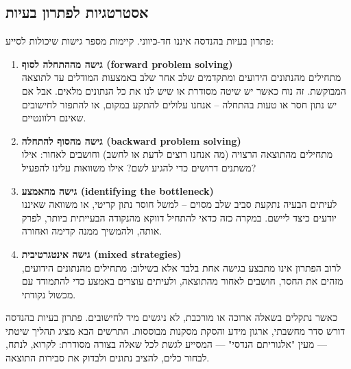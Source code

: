 \documentclass[
  hebrew,
  letterpaper,
  DIV=11,
  numbers=noendperiod]{scrreprt}
\begin{document}
\subsection{\texorpdfstring{{אסטרטגיות לפתרון
בעיות}}{אסטרטגיות לפתרון בעיות}}\label{ux5d0ux5e1ux5d8ux5e8ux5d8ux5d2ux5d9ux5d5ux5ea-ux5dcux5e4ux5eaux5e8ux5d5ux5df-ux5d1ux5e2ux5d9ux5d5ux5ea}

{פתרון בעיות בהנדסה איננו חד-כיווני. קיימות מספר גישות שיכולות לסייע}:

\begin{enumerate}
\def\labelenumi{\arabic{enumi}.}
\item
  \textbf{{גישה מההתחלה לסוף} (forward problem solving)}\\
  {מתחילים מהנתונים הידועים ומתקדמים שלב אחר שלב באמצעות המודלים עד
  לתוצאה המבוקשת}. {זה נוח כאשר יש שיטה מסודרת או שיש לנו את כל הנתונים
  מלאים. אבל} {אם יש נתון חסר או טעות בהתחלה -- אנחנו עלולים להתקע
  במקום, או להתפזר לחישובים שאינם רלוונטיים.}
\item
  \textbf{{גישה מהסוף להתחלה} {}(backward problem solving)}\\
  {מתחילים מהתוצאה הרצויה (מה אנחנו רוצים לדעת או לחשב) וחושבים לאחור:
  אילו משתנים דרושים כדי להגיע לשם? אילו משוואות עלינו להפעיל}? {}
\item
  \textbf{{גישה מהאמצע} (identifying the bottleneck)}\\
  {לעיתים הבעיה נתקעת סביב שלב מסוים -- למשל חוסר נתון קריטי, או משוואה
  שאיננו יודעים כיצד ליישם. במקרה כזה כדאי להתחיל דווקא מהנקודה הבעייתית
  ביותר, לפרק אותה, ולהמשיך ממנה קדימה ואחורה}.
\item
  \textbf{{גישה אינטגרטיבית} {}(mixed strategies)}\\
  {לרוב הפתרון אינו מתבצע בגישה אחת בלבד אלא בשילוב: מתחילים מהנתונים
  הידועים, מזהים את החסר, חושבים לאחור מהתוצאה, ולעיתים עוצרים באמצע כדי
  להתמודד עם מכשול נקודתי}.
\end{enumerate}

{כאשר נתקלים בשאלה ארוכה או מורכבת, לא ניגשים מיד לחישובים. פתרון בעיות
בהנדסה דורש סדר מחשבתי, ארגון מידע והסקת מסקנות מבוססות. התרשים הבא מציג
תהליך שיטתי --- מעין "אלגוריתם הנדסי" --- המסייע לגשת לכל שאלה בצורה
מסודרת: לקרוא, לנתח, לבחור כלים, להציב נתונים ולבדוק את סבירות התוצאה}.
\end{document}
